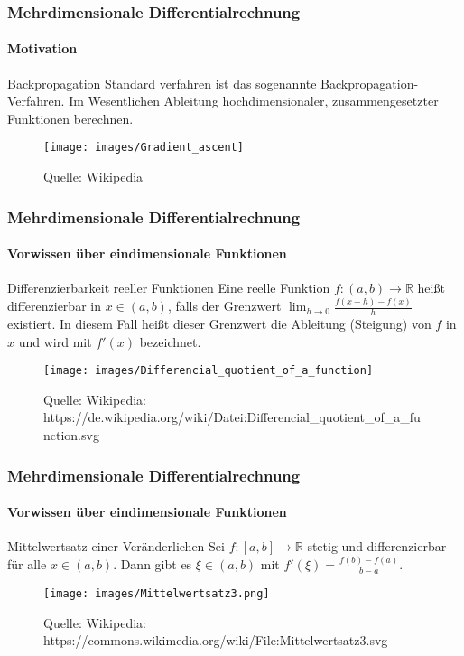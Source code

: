 \documentclass{beamer}
\begin{document}
\begin{frame}
    \frametitle{Mehrdimensionale Differentialrechnung}
\framesubtitle{Motivation}
    \begin{block}{Backpropagation}
Standard verfahren ist das sogenannte Backpropagation-Verfahren.
Im Wesentlichen Ableitung hochdimensionaler, zusammengesetzter Funktionen berechnen.
\end{block}

\begin{figure}[htp]
    \texttt{[image: images/Gradient\_ascent]}
      \caption{Quelle: Wikipedia}
\end{figure}
 \end{frame}


\begin{frame}
    \frametitle{Mehrdimensionale Differentialrechnung}
\framesubtitle{Vorwissen über eindimensionale  Funktionen}
    \begin{block}{Differenzierbarkeit reeller Funktionen}
Eine reelle Funktion $f : (a, b) \to \mathbb{R}$  heißt differenzierbar in $x \in (a,b)$, falls der Grenzwert $\lim_{h \to 0}  \frac{f(x +h) - f(x)}  {h}$ existiert. In diesem Fall heißt dieser Grenzwert die Ableitung (Steigung) von $f$ in $x$ und wird mit $f' (x)$ bezeichnet.
\end{block}
\begin{figure}[H]
      \centering
    \texttt{[image: images/Differencial\_quotient\_of\_a\_function]}
      \caption{Quelle: Wikipedia: https://de.wikipedia.org/wiki/Datei:Differencial\_quotient\_of\_a\_function.svg}
\end{figure}
 \end{frame}

\begin{frame}
    \frametitle{Mehrdimensionale Differentialrechnung}
\framesubtitle{Vorwissen über eindimensionale  Funktionen}
    \begin{block}{Mittelwertsatz einer Veränderlichen}
Sei $f : [a,b] \to \mathbb{R}$ stetig und differenzierbar für alle $x \in (a,b)$. Dann gibt es $\xi \in (a,b)$ mit
$f'(\xi) = \frac{f(b) - f(a)} { b-a}$.
\end{block}
\begin{figure}[H]
      \centering
    \texttt{[image: images/Mittelwertsatz3.png]}
      \caption{Quelle: Wikipedia: https://commons.wikimedia.org/wiki/File:Mittelwertsatz3.svg}
\end{figure}
 \end{frame}
\end{document}
